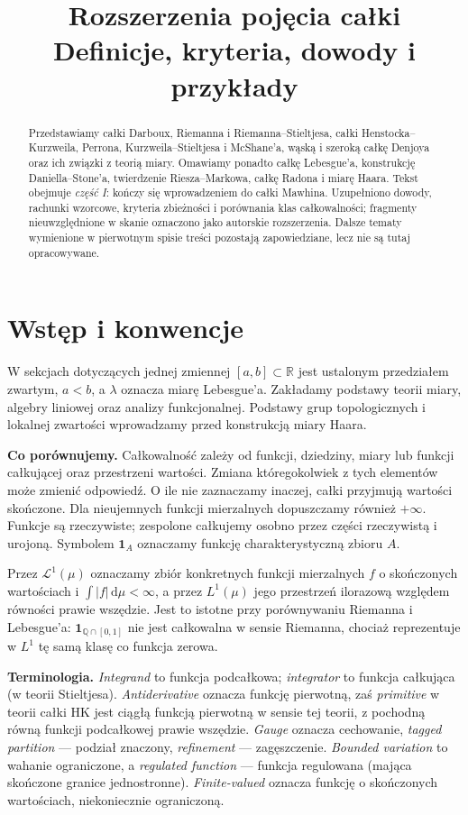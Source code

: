 \documentclass[11pt,a4paper]{article}
\title{Rozszerzenia pojęcia całki\\\large Definicje, kryteria, dowody i przykłady}
\author{}
\date{}
\numberwithin{equation}{section}
\theoremstyle{plain}
\theoremstyle{definition}
\theoremstyle{remark}
\newcommand{\R}{\mathbb R}
\newcommand{\Q}{\mathbb Q}
\newcommand{\ind}[1]{\mathbf 1_{#1}}
\begin{document}
\maketitle
\begin{abstract}
Przedstawiamy całki Darboux, Riemanna i Riemanna--Stieltjesa, całki Henstocka--Kurzweila, Perrona, Kurzweila--Stieltjesa i McShane'a, wąską i szeroką całkę Denjoya oraz ich związki z teorią miary. Omawiamy ponadto całkę Lebesgue'a, konstrukcję Daniella--Stone'a, twierdzenie Riesza--Markowa, całkę Radona i miarę Haara. Tekst obejmuje \emph{część I}: kończy się wprowadzeniem do całki Mawhina. Uzupełniono dowody, rachunki wzorcowe, kryteria zbieżności i porównania klas całkowalności; fragmenty nieuwzględnione w skanie oznaczono jako autorskie rozszerzenia. Dalsze tematy wymienione w pierwotnym spisie treści pozostają zapowiedziane, lecz nie są tutaj opracowywane.
\end{abstract}
\tableofcontents

\section*{Wstęp i konwencje}
W sekcjach dotyczących jednej zmiennej $[a,b]\subset\R$ jest ustalonym przedziałem zwartym, $a<b$, a $\lambda$ oznacza miarę Lebesgue'a. Zakładamy podstawy teorii miary, algebry liniowej oraz analizy funkcjonalnej. Podstawy grup topologicznych i lokalnej zwartości wprowadzamy przed konstrukcją miary Haara.

\textbf{Co porównujemy.} Całkowalność zależy od funkcji, dziedziny, miary lub funkcji całkującej oraz przestrzeni wartości. Zmiana któregokolwiek z tych elementów może zmienić odpowiedź. O ile nie zaznaczamy inaczej, całki przyjmują wartości skończone. Dla nieujemnych funkcji mierzalnych dopuszczamy również $+\infty$. Funkcje są rzeczywiste; zespolone całkujemy osobno przez części rzeczywistą i urojoną. Symbolem $\ind{A}$ oznaczamy funkcję charakterystyczną zbioru $A$.

Przez $\mathcal L^1(\mu)$ oznaczamy zbiór konkretnych funkcji mierzalnych $f$ o skończonych wartościach i $\int |f|\,\mathrm d\mu<\infty$, a przez $L^1(\mu)$ jego przestrzeń ilorazową względem równości prawie wszędzie. Jest to istotne przy porównywaniu Riemanna i Lebesgue'a: $\ind{\Q\cap[0,1]}$ nie jest całkowalna w sensie Riemanna, chociaż reprezentuje w $L^1$ tę samą klasę co funkcja zerowa.

\textbf{Terminologia.} \emph{Integrand} to funkcja podcałkowa; \emph{integrator} to funkcja całkująca (w teorii Stieltjesa). \emph{Antiderivative} oznacza funkcję pierwotną, zaś \emph{primitive} w teorii całki HK jest ciągłą funkcją pierwotną w sensie tej teorii, z pochodną równą funkcji podcałkowej prawie wszędzie. \emph{Gauge} oznacza cechowanie, \emph{tagged partition} --- podział znaczony, \emph{refinement} --- zagęszczenie. \emph{Bounded variation} to wahanie ograniczone, a \emph{regulated function} --- funkcja regulowana (mająca skończone granice jednostronne). \emph{Finite-valued} oznacza funkcję o skończonych wartościach, niekoniecznie ograniczoną.
\end{document}
